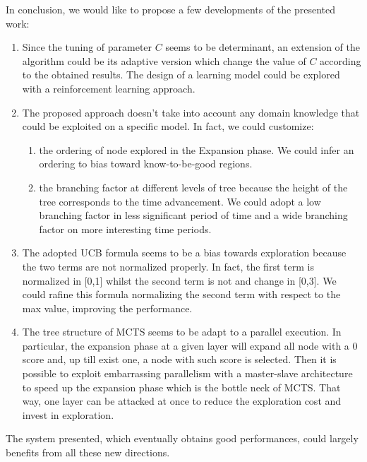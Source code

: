 \documentclass[11pt]{article}
\begin{document}
In conclusion, we would like to propose a few developments of the presented work:
\begin{enumerate}
    \item Since the tuning of parameter $C$ seems to be determinant, an extension of the algorithm could be its adaptive version which change the value of $C$ according to the obtained results. The design of a learning model could be explored with a reinforcement learning approach. 
    \item The proposed approach doesn't take into account any domain knowledge that could be exploited on a specific model. In fact, we could customize:
        \begin{enumerate}
            \item the ordering of node explored in the Expansion phase. We could infer an ordering to bias toward know-to-be-good regions.
            \item the branching factor at different levels of tree because the height of the tree corresponds to the time advancement. We could adopt a low branching factor in less significant period of time and a wide branching factor on more interesting time periods.
        \end{enumerate}
    \item The adopted UCB formula seems to be a bias towards exploration because the two terms are not normalized properly. In fact, the first term is normalized in [0,1] whilst the second term is not and change in [0,3]. We could rafine this formula normalizing the second term with respect to the max value, improving the performance.
    \item The tree structure of MCTS seems to be adapt to a parallel execution. In particular, the expansion phase at a given layer will expand all node with a 0 score and, up till exist one, a node with such score is selected. Then it is possible to exploit embarrassing parallelism with a master-slave architecture to speed up the expansion phase which is the bottle neck of MCTS. That way, one layer can be attacked at once to reduce the exploration cost and invest in exploration. 
\end{enumerate}

The system presented, which eventually obtains good performances, could largely benefits from all these new directions.




\end{document}

